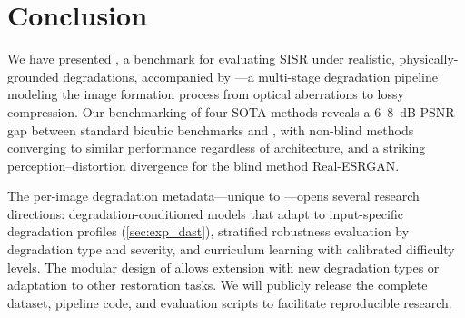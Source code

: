 \section{Conclusion}
\label{sec:conclusion}

We have presented \dataset, a benchmark for evaluating SISR under realistic, physically-grounded degradations, accompanied by \pipeline---a multi-stage degradation pipeline modeling the image formation process from optical aberrations to lossy compression.
Our benchmarking of four SOTA methods reveals a 6--8~dB PSNR gap between standard bicubic benchmarks and \dataset, with non-blind methods converging to similar performance regardless of architecture, and a striking perception--distortion divergence for the blind method Real-ESRGAN.

The per-image degradation metadata---unique to \dataset---opens several research directions: degradation-conditioned models that adapt to input-specific degradation profiles (\cf \cref{sec:exp_dast}), stratified robustness evaluation by degradation type and severity, and curriculum learning with calibrated difficulty levels.
The modular design of \pipeline allows extension with new degradation types or adaptation to other restoration tasks.
We will publicly release the complete dataset, pipeline code, and evaluation scripts to facilitate reproducible research.
